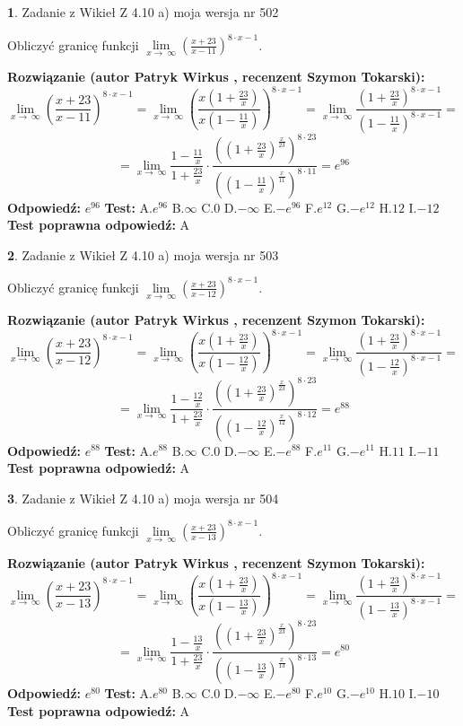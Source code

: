 \documentclass[12pt, a4paper]{article}
\theoremstyle{definition} %
\newtheorem{zad}{}
\newcommand{\zadStart}[1]{\begin{zad}#1\newline}
\newcommand{\zadStop}{\end{zad}}
\newcommand{\rozwStart}[2]{\noindent \textbf{Rozwiązanie (autor #1 , recenzent #2): }\newline}
\newcommand{\rozwStop}{\newline}
\newcommand{\odpStart}{\noindent \textbf{Odpowiedź:}\newline}
\newcommand{\odpStop}{\newline}
\newcommand{\testStart}{\noindent \textbf{Test:}\newline}
\newcommand{\testStop}{\newline}
\newcommand{\kluczStart}{\noindent \textbf{Test poprawna odpowiedź:}\newline}
\newcommand{\kluczStop}{\newline}
\begin{document}
\zadStart{Zadanie z Wikieł Z 4.10 a) moja wersja nr 502}

Obliczyć granicę funkcji  $\lim\limits_{x\to\ \infty}(\frac{x+23}{x-11})^{8\cdot x-1}$.
\zadStop
\rozwStart{Patryk Wirkus}{Szymon Tokarski}
$$\lim\limits_{x\to\ \infty}(\frac{x+23}{x-11})^{8\cdot x-1} = \lim\limits_{x\to\ \infty}(\frac{x(1+\frac{23}{x})}{x(1-\frac{11}{x})})^{8\cdot x-1}=\lim\limits_{x\to\ \infty}\frac{(1+\frac{23}{x})^{8\cdot x-1}}{(1-\frac{11}{x})^{8\cdot x-1}}=$$
$$=\lim\limits_{x\to\ \infty}\frac{1-\frac{11}{x}}{1+\frac{23}{x}}\cdot\frac{((1+\frac{23}{x})^{\frac{x}{23}})^{8\cdot23}}{((1-\frac{11}{x})^{\frac{x}{11}})^{8\cdot11}}=e^{96}$$
\rozwStop
\odpStart
$e^{96}$
\odpStop
\testStart
A.$e^{96}$ B.$\infty$ C.$0$ D.$-\infty$ E.$-e^{96}$
F.$e^{12}$ G.$-e^{12}$
H.$12$
I.$-12$
\testStop
\kluczStart
A
\kluczStop



\zadStart{Zadanie z Wikieł Z 4.10 a) moja wersja nr 503}

Obliczyć granicę funkcji  $\lim\limits_{x\to\ \infty}(\frac{x+23}{x-12})^{8\cdot x-1}$.
\zadStop
\rozwStart{Patryk Wirkus}{Szymon Tokarski}
$$\lim\limits_{x\to\ \infty}(\frac{x+23}{x-12})^{8\cdot x-1} = \lim\limits_{x\to\ \infty}(\frac{x(1+\frac{23}{x})}{x(1-\frac{12}{x})})^{8\cdot x-1}=\lim\limits_{x\to\ \infty}\frac{(1+\frac{23}{x})^{8\cdot x-1}}{(1-\frac{12}{x})^{8\cdot x-1}}=$$
$$=\lim\limits_{x\to\ \infty}\frac{1-\frac{12}{x}}{1+\frac{23}{x}}\cdot\frac{((1+\frac{23}{x})^{\frac{x}{23}})^{8\cdot23}}{((1-\frac{12}{x})^{\frac{x}{12}})^{8\cdot12}}=e^{88}$$
\rozwStop
\odpStart
$e^{88}$
\odpStop
\testStart
A.$e^{88}$ B.$\infty$ C.$0$ D.$-\infty$ E.$-e^{88}$
F.$e^{11}$ G.$-e^{11}$
H.$11$
I.$-11$
\testStop
\kluczStart
A
\kluczStop



\zadStart{Zadanie z Wikieł Z 4.10 a) moja wersja nr 504}

Obliczyć granicę funkcji  $\lim\limits_{x\to\ \infty}(\frac{x+23}{x-13})^{8\cdot x-1}$.
\zadStop
\rozwStart{Patryk Wirkus}{Szymon Tokarski}
$$\lim\limits_{x\to\ \infty}(\frac{x+23}{x-13})^{8\cdot x-1} = \lim\limits_{x\to\ \infty}(\frac{x(1+\frac{23}{x})}{x(1-\frac{13}{x})})^{8\cdot x-1}=\lim\limits_{x\to\ \infty}\frac{(1+\frac{23}{x})^{8\cdot x-1}}{(1-\frac{13}{x})^{8\cdot x-1}}=$$
$$=\lim\limits_{x\to\ \infty}\frac{1-\frac{13}{x}}{1+\frac{23}{x}}\cdot\frac{((1+\frac{23}{x})^{\frac{x}{23}})^{8\cdot23}}{((1-\frac{13}{x})^{\frac{x}{13}})^{8\cdot13}}=e^{80}$$
\rozwStop
\odpStart
$e^{80}$
\odpStop
\testStart
A.$e^{80}$ B.$\infty$ C.$0$ D.$-\infty$ E.$-e^{80}$
F.$e^{10}$ G.$-e^{10}$
H.$10$
I.$-10$
\testStop
\kluczStart
A
\kluczStop
\end{document}
